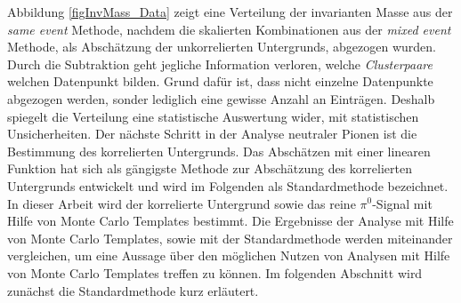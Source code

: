 \newline
Abbildung \ref{figInvMass_Data} zeigt eine Verteilung der invarianten Masse aus der \textit{same event} Methode, nachdem die skalierten Kombinationen aus der \textit{mixed event} Methode, als Abschätzung der unkorrelierten Untergrunds, abgezogen wurden.
Durch die Subtraktion geht jegliche Information verloren, welche \textit{Clusterpaare} welchen Datenpunkt bilden.
Grund dafür ist, dass nicht einzelne Datenpunkte abgezogen werden, sonder lediglich eine gewisse Anzahl an Einträgen.
Deshalb spiegelt die Verteilung eine statistische Auswertung wider, mit statistischen Unsicherheiten.
\newline
Der nächste Schritt in der Analyse neutraler Pionen ist die Bestimmung des korrelierten Untergrunds.
Das Abschätzen mit einer linearen Funktion hat sich als gängigste Methode zur Abschätzung des korrelierten Untergrunds entwickelt und wird im Folgenden als Standardmethode bezeichnet.
In dieser Arbeit wird der korrelierte Untergrund sowie das reine $\pi^{0}$-Signal mit Hilfe von Monte Carlo Templates bestimmt.
Die Ergebnisse der Analyse mit Hilfe von Monte Carlo Templates, sowie mit der Standardmethode werden miteinander vergleichen, um eine Aussage über den möglichen Nutzen von Analysen mit Hilfe von Monte Carlo Templates treffen zu können.
Im folgenden Abschnitt wird zunächst die Standardmethode kurz erläutert.
